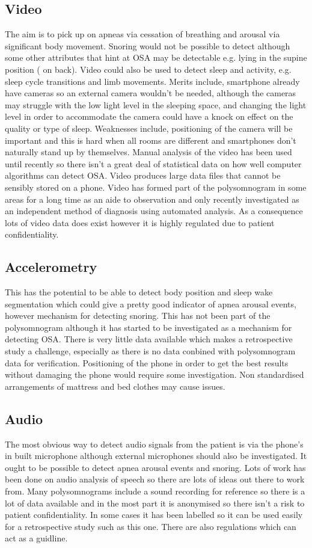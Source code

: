 \subsection{Video}
The aim is to pick up on apneas via cessation of breathing and arousal via significant body movement. Snoring would not be possible to detect although some other attributes that hint at OSA may be detectable e.g. lying in the supine position ( on back). Video could also be used to detect sleep and activity, e.g. sleep cycle transitions and limb movements. 
Merits include, smartphone already have cameras so an external camera wouldn’t be needed, although the cameras may struggle with the low light level in the sleeping space, and changing the light level in order to accommodate the camera could have a knock on effect on the quality or type of sleep. 
Weaknesses include, positioning of the camera will be important and this is hard when all rooms are different and smartphones don’t naturally stand up by themselves. Manual analysis of the video has been used until recently so there isn’t a great deal of statistical data on how well computer algorithms can detect OSA. Video produces large data files that cannot be sensibly stored on a phone. Video has formed part of the polysomnogram in some areas for a long time as an aide to observation and only recently investigated as an independent method of diagnosis using automated analysis. As a consequence lots of video data does exist however it is highly regulated due to patient confidentiality. 

\subsection{Accelerometry}
This has the potential to be able to detect body position and sleep wake segmentation which could give a pretty good indicator of apnea arousal events, however mechanism for detecting snoring.
This has not been part of the polysomnogram although it has started to be investigated as a mechanism for detecting OSA. There is very little data available which makes a retrospective study a challenge, especially as there is no data conbined with polysomnogram data for verification. Positioning of the phone in order to get the best results without damaging the phone would require some investigation. Non standardised arrangements of mattress and bed clothes may cause issues. 

\subsection{Audio}
The most obvious way to detect audio signals from the patient is via the phone’s in built microphone although external microphones should also be investigated. It ought to be possible to detect apnea arousal events and snoring. 
Lots of work has been done on audio analysis of speech so there are lots of ideas out there to work from. Many polysomnograms include a sound recording for reference so there is a lot of data available and in the most part it is anonymised so there isn’t a risk to patient confidentiality. In some cases it has been labelled so it can be used easily for a retrospective study such as this one. There are also regulations which can act as a guidline. 

